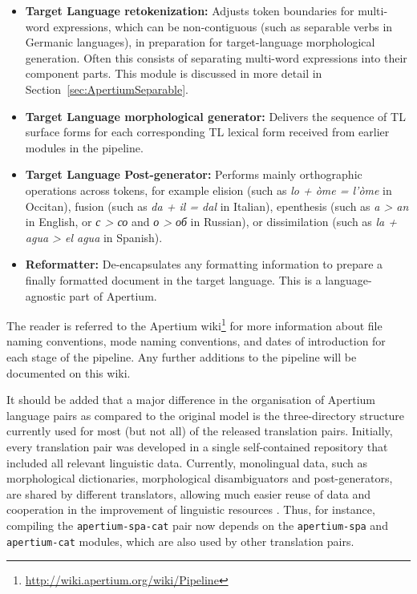 \documentclass[free]{flammie}
\begin{document}
\begin{itemize}
    \item \textbf{Target Language retokenization:} Adjusts token boundaries for
        multi-word expressions, which can be non-contiguous (such as separable
        verbs in Germanic languages), in preparation for target-language
        morphological generation.  Often this consists of separating multi-word
        expressions into their component parts.  This module is discussed in
        more detail in Section~\ref{sec:ApertiumSeparable}.
\end{itemize}

\begin{itemize}
    \item \textbf {Target Language morphological generator:} Delivers the
        sequence of TL surface forms for each corresponding TL lexical form
        received from earlier modules in the pipeline.
\end{itemize}

\begin{itemize}
    \item \textbf{Target Language Post-generator:} Performs mainly orthographic
        operations across tokens, for example elision (such as \textit{lo + òme
        = l'òme} in Occitan), fusion (such as \textit{da + il = dal} in
        Italian), epenthesis (such as \textit{a > an} in English, or \textit{с >
        со} and \textit{о > об} in Russian), or dissimilation (such as
        \textit{la + agua > el agua} in Spanish).
\end{itemize}

\begin{itemize}
    \item \textbf{Reformatter:} De-encapsulates any formatting information to
        prepare a finally formatted document in the target language. This is a
        language-agnostic part of Apertium.
\end{itemize}

The reader is referred to the Apertium
wiki\footnote{\url{http://wiki.apertium.org/wiki/Pipeline}} for more information
about file naming conventions, mode naming conventions, and dates of
introduction for each stage of the pipeline. Any further additions to the
pipeline will be documented on this wiki.

It should be added that a major difference in the organisation of Apertium
language pairs as compared to the original model is the three-directory
structure currently used for most (but not all) of the released translation
pairs. Initially, every translation pair was developed in a single
self-contained repository that included all relevant linguistic data. Currently,
monolingual data, such as morphological dictionaries, morphological
disambiguators and post-generators, are shared by different translators,
allowing much easier reuse of data and cooperation in the improvement of
linguistic resources \cite{marting2014fst}. Thus, for instance, compiling the
\texttt{apertium-spa-cat} pair now depends on the \texttt{apertium-spa} and
\texttt{apertium-cat} modules, which are also used by other translation pairs.
\end{document}
